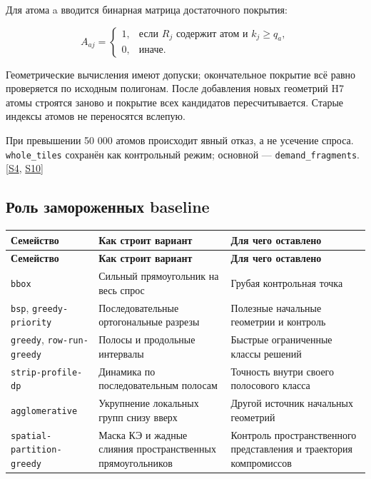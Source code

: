 \documentclass[11pt,a4paper]{article}
\begin{document}
Для атома a вводится бинарная матрица достаточного покрытия:


\[
A_{aj}=\begin{cases}
1,&\text{если }R_j\text{ содержит атом и }k_j\ge q_a,\\
0,&\text{иначе}.
\end{cases}
\]

Геометрические вычисления имеют допуски; окончательное покрытие всё равно проверяется по исходным полигонам. После добавления новых геометрий H7 атомы строятся заново и покрытие всех кандидатов пересчитывается. Старые индексы атомов не переносятся вслепую.


При превышении 50 000 атомов происходит явный отказ, а не усечение спроса. {\small\nolinkurl{whole_tiles}} сохранён как контрольный режим; основной — {\small\nolinkurl{demand_fragments}}. {\color{Teal}\small[\hyperlink{S4}{S4}, \hyperlink{S10}{S10}]}


\subsection{Роль замороженных baseline}

{\small\setlength{\tabcolsep}{4pt}
\begin{longtable}{@{}L{41.178mm}L{63.351mm}L{53.848mm}@{}}
\toprule
\textbf{Семейство} & \textbf{Как строит вариант} & \textbf{Для чего оставлено} \\
\midrule\endfirsthead
\toprule
\textbf{Семейство} & \textbf{Как строит вариант} & \textbf{Для чего оставлено} \\
\midrule\endhead
\bottomrule\endfoot
{\small\nolinkurl{bbox}} & Сильный прямоугольник на весь спрос & Грубая контрольная точка \\
{\small\nolinkurl{bsp}}, {\small\nolinkurl{greedy-priority}} & Последовательные ортогональные разрезы & Полезные начальные геометрии и контроль \\
{\small\nolinkurl{greedy}}, {\small\nolinkurl{row-run-greedy}} & Полосы и продольные интервалы & Быстрые ограниченные классы решений \\
{\small\nolinkurl{strip-profile-dp}} & Динамика по последовательным полосам & Точность внутри своего полосового класса \\
{\small\nolinkurl{agglomerative}} & Укрупнение локальных групп снизу вверх & Другой источник начальных геометрий \\
{\small\nolinkurl{spatial-partition-greedy}} & Маска КЭ и жадные слияния пространственных прямоугольников & Контроль пространственного представления и траектория компромиссов \\
\end{longtable}}
\end{document}
